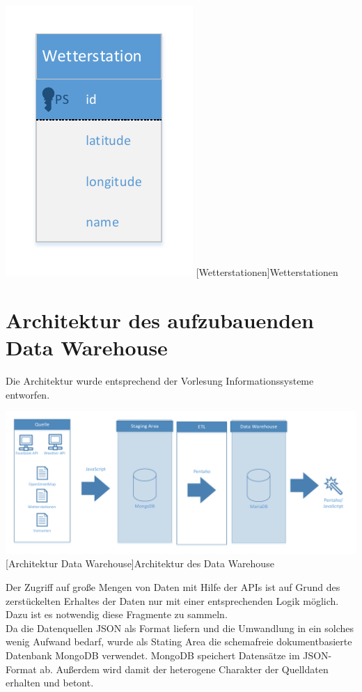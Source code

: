 \documentclass[a4paper,12pt]{scrartcl}
\makeatletter
\def\ScaleIfNeeded{%
\ifdim\Gin@nat@width>\linewidth
\linewidth
\else
\Gin@nat@width
\fi
}
\makeatother
\begin{document}
\begin{center}
\centering
\includegraphics[width=\ScaleIfNeeded]{../Wetterstation.pdf}%
[Wetterstationen]{Wetterstationen}%
\end{center}


\section{Architektur des aufzubauenden Data Warehouse}

Die Architektur wurde entsprechend der Vorlesung Informationssysteme entworfen.

\begin{center}
\centering
\includegraphics[width=\ScaleIfNeeded]{../Architektur.pdf}%
[Architektur Data Warehouse]{Architektur des Data Warehouse}%
\end{center}

Der Zugriff auf große Mengen von Daten mit Hilfe der APIs ist auf Grund des zerstückelten Erhaltes der Daten nur mit einer entsprechenden Logik möglich. Dazu ist es notwendig diese Fragmente zu sammeln.\\
Da die Datenquellen JSON als Format liefern und die Umwandlung in ein solches wenig Aufwand bedarf, wurde als Stating Area die schemafreie dokumentbasierte Datenbank MongoDB verwendet. MongoDB speichert Datensätze im JSON-Format ab. Außerdem wird damit der heterogene Charakter der Quelldaten erhalten und betont.\\
\end{document}
